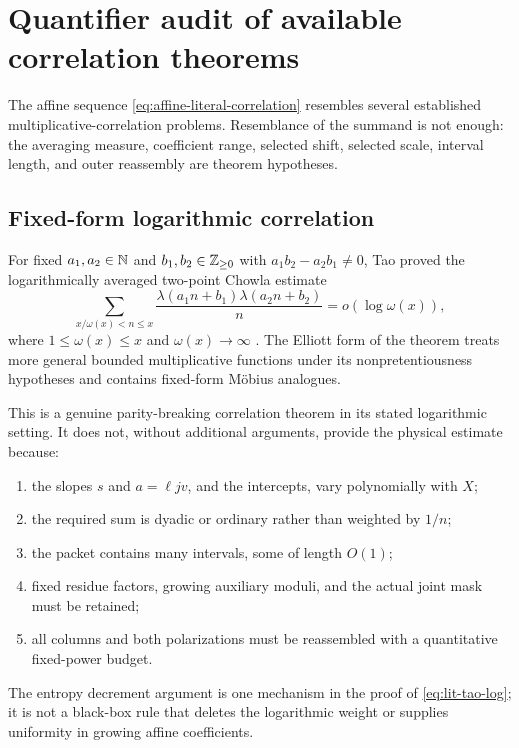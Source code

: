 \section{Quantifier audit of available correlation theorems}
\label{sec:literature-quantifiers}

The affine sequence \eqref{eq:affine-literal-correlation} resembles
several established multiplicative-correlation problems.  Resemblance
of the summand is not enough: the averaging measure, coefficient
range, selected shift, selected scale, interval length, and outer
reassembly are theorem hypotheses.

\subsection{Fixed-form logarithmic correlation}

For fixed \(a_1,a_2\in\mathbb N\) and
\(b_1,b_2\in\mathbb Z_{\ge0}\) with
\(a_1b_2-a_2b_1\ne0\), Tao proved the logarithmically averaged
two-point Chowla estimate
\begin{equation}
 \sum_{x/\omega(x)<n\le x}
 \frac{\lambda(a_1n+b_1)\lambda(a_2n+b_2)}{n}
 =o(\log\omega(x)),
 \label{eq:lit-tao-log}
\end{equation}
where \(1\le\omega(x)\le x\) and \(\omega(x)\to\infty\)
\citep{Tao2016LogChowla}.  The Elliott form of the theorem treats
more general bounded multiplicative functions under its
nonpretentiousness hypotheses and contains fixed-form M\"obius
analogues.

This is a genuine parity-breaking correlation theorem in its stated
logarithmic setting.  It does not, without additional arguments,
provide the physical estimate because:
\begin{enumerate}[label=\textup{(\alph*)},leftmargin=2.3em]
 \item the slopes \(s\) and \(a=\ell jv\), and the intercepts, vary
 polynomially with \(X\);
 \item the required sum is dyadic or ordinary rather than weighted
 by \(1/n\);
 \item the packet contains many intervals, some of length \(O(1)\);
 \item fixed residue factors, growing auxiliary moduli, and the
 actual joint mask must be retained;
 \item all columns and both polarizations must be reassembled with a
 quantitative fixed-power budget.
\end{enumerate}
The entropy decrement argument is one mechanism in the proof of
\eqref{eq:lit-tao-log}; it is not a black-box rule that deletes the
logarithmic weight or supplies uniformity in growing affine
coefficients.

